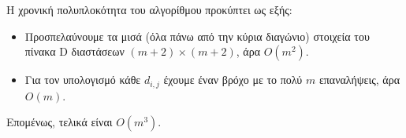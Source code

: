 \documentclass[12pt]{article}
\begin{document}
\bigskip
Η χρονική πολυπλοκότητα του αλγορίθμου προκύπτει ως εξής: 
\begin{itemize}
    \item Προσπελαύνουμε τα μισά (όλα πάνω από την κύρια διαγώνιο) στοιχεία του πίνακα D διαστάσεων \((m+2)\times (m+2)\), άρα \(O(m^2)\).
    \item Για τον υπολογισμό κάθε \(d_{i,j}\) έχουμε έναν βρόχο με το πολύ \(m\) επαναλήψεις, άρα \(O(m)\).
\end{itemize}
Επομένως, τελικά είναι \(O(m^3)\). \hfill \blacksquare
\end{document}
